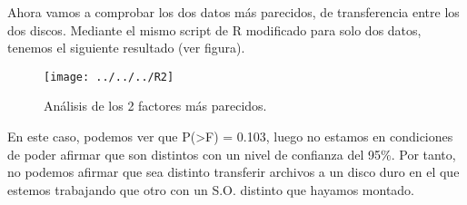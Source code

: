 \documentclass[a4paper, 11pt]{article} %
\begin{document}
Ahora vamos a comprobar los dos datos más parecidos, de transferencia entre los dos discos. Mediante el mismo script de R modificado para solo dos datos, tenemos el siguiente resultado (ver figura). 
  
 
\begin{figure}[htpb]
\centering
\texttt{[image: ../../../R2]}
\caption{Análisis de los 2 factores más parecidos.}
\end{figure}

\pagebreak

En este caso, podemos ver que P(>F) = 0.103, luego no estamos en condiciones de poder afirmar que son distintos con un nivel de confianza del 95\%. Por tanto, no podemos afirmar que sea distinto transferir archivos a un disco duro en el que estemos trabajando que otro con un S.O. distinto que hayamos montado. 
\end{document}
